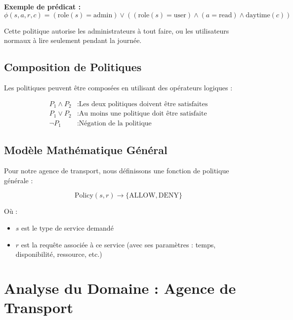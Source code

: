\documentclass[12pt,a4paper]{article}
\begin{document}
    \textbf{Exemple de prédicat :}
    \begin{equation}
        \phi(s,a,r,c) = (\text{role}(s) = \text{admin}) \vee ((\text{role}(s) = \text{user}) \wedge (a = \text{read}) \wedge \text{daytime}(c))
    \end{equation}

    Cette politique autorise les administrateurs à tout faire, ou les utilisateurs normaux à lire seulement pendant la journée.

    \subsection{Composition de Politiques}

    Les politiques peuvent être composées en utilisant des opérateurs logiques :

    \begin{align}
        P_1 \wedge P_2 &: \text{Les deux politiques doivent être satisfaites} \\
        P_1 \vee P_2 &: \text{Au moins une politique doit être satisfaite} \\
        \neg P_1 &: \text{Négation de la politique}
    \end{align}

    \subsection{Modèle Mathématique Général}

    Pour notre agence de transport, nous définissons une fonction de politique générale :

    \begin{equation}
        \text{Policy}(s, r) \rightarrow \{\text{ALLOW}, \text{DENY}\}
    \end{equation}

    Où :
    \begin{itemize}
        \item $s$ est le type de service demandé
        \item $r$ est la requête associée à ce service (avec ses paramètres : temps, disponibilité, ressource, etc.)
    \end{itemize}

    \newpage

    \section{Analyse du Domaine : Agence de Transport}
\end{document}
